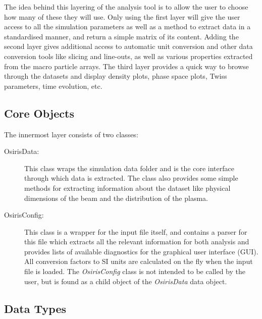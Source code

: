 The idea behind this layering of the analysis tool is to allow the user to choose how many of these they will use.
Only using the first layer will give the user access to all the simulation parameters as well as a method to extract data in a standardised manner, and return a simple matrix of its content.
Adding the second layer gives additional access to automatic unit conversion and other data conversion tools like slicing and line-outs, as well as various properties extracted from the macro particle arrays.
The third layer provides a quick way to browse through the datasets and display density plots, phase space plots, Twiss parameters, time evolution, etc.

\subsection{Core Objects}
\label{Tools:OALay1}

The innermost layer consists of two classes:

\begin{description}
    \item[OsirisData:] This class wraps the simulation data folder and is the core interface through which data is extracted.
    The class also provides some simple methods for extracting information about the dataset like physical dimensions of the beam and the distribution of the plasma.
    
    \item[OsirisConfig:] This class is a wrapper for the input file itself, and contains a parser for this file which extracts all the relevant information for both analysis and provides lists of available diagnostics for the graphical user interface (GUI).
    All conversion factors to SI units are calculated on the fly when the input file is loaded.
    The \emph{OsirisConfig} class is not intended to be called by the user, but is found as a child object of the \emph{OsirisData} data object.
\end{description}

\subsection{Data Types}
\label{Tools:OALay2}

